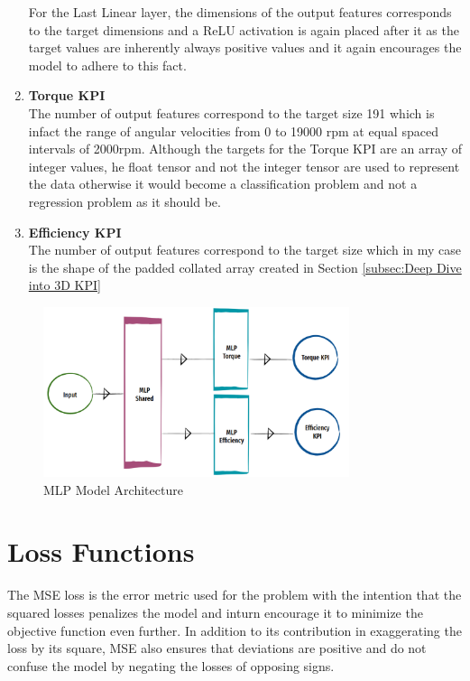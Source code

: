 \documentclass{report} %
\begin{document}
\begin{enumerate}
    For the Last Linear layer, the dimensions of the output features corresponds to the target dimensions and a \ac{ReLU} activation is again placed after it as the target values are inherently 
    always positive values and it again encourages the model to adhere to this fact.
    \item \textbf{Torque \ac{KPI}} \\
    The number of output features correspond to the target size 191 which is infact the range of angular velocities from 0 to 19000 rpm at equal spaced intervals of 2000rpm.
    Although the targets for the Torque \ac{KPI} are an array of integer values, he float tensor and not the integer tensor are used to represent the data otherwise 
    it would become a classification problem and not a regression problem as it should be. 
    \item \textbf{Efficiency \ac{KPI}} \\
    The number of output features correspond to the target size which in my case is the shape of the padded collated array created in Section \ref{subsec:Deep Dive into 3D KPI}
\end{enumerate}

\begin{figure}[H]
    \centering
    \includegraphics[width=0.8\textwidth]{./ReportImages/mlp_architecture.png} 
    \caption{\ac{MLP} Model Architecture}
    \label{fig:MLP Model Architecture}
\end{figure}

\section{Loss Functions}\label{sec:Loss Functions}
The \ac{MSE} loss is the error metric used for the problem with the intention that the squared losses penalizes the model and inturn encourage it to 
minimize the objective function even further. In addition to its contribution in exaggerating the loss by its square, \ac{MSE} also ensures that deviations are 
positive and do not confuse the model by negating the losses of opposing signs. 
\end{document}
